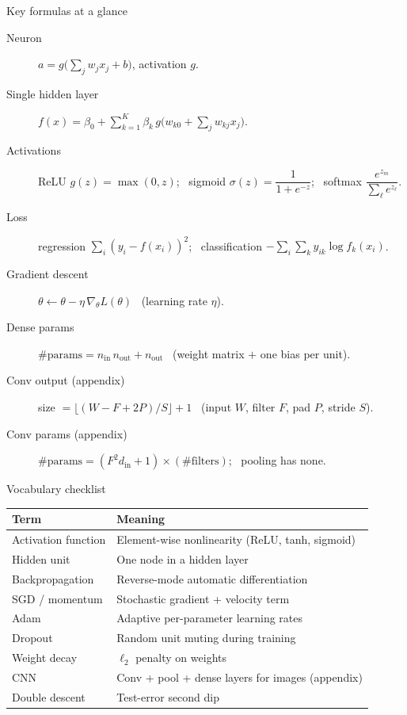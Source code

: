 \documentclass[aspectratio=169,11pt]{beamer}
\begin{document}
\begin{frame}{Key formulas at a glance}
  \footnotesize
  \begin{description}
    \item[Neuron] $a=g\!\big(\textstyle\sum_j w_j x_j+b\big)$, activation $g$.
    \item[Single hidden layer] $f(x)=\beta_0+\sum_{k=1}^{K}\beta_k\,g\!\big(w_{k0}+\sum_j w_{kj}x_j\big)$.
    \item[Activations] ReLU $g(z)=\max(0,z)$; \ sigmoid $\sigma(z)=\dfrac{1}{1+e^{-z}}$; \ softmax $\dfrac{e^{z_m}}{\sum_\ell e^{z_\ell}}$.
    \item[Loss] regression $\sum_i(y_i-f(x_i))^2$; \ classification $-\sum_i\sum_k y_{ik}\log f_k(x_i)$.
    \item[Gradient descent] $\theta \leftarrow \theta-\eta\,\nabla_\theta L(\theta)$ \ (learning rate $\eta$).
    \item[Dense params] $\#\text{params}=n_{\text{in}}\,n_{\text{out}}+n_{\text{out}}$ \ (weight matrix $+$ one bias per unit).
    \item[Conv output (appendix)] size $=\big\lfloor (W-F+2P)/S\big\rfloor+1$ \ (input $W$, filter $F$, pad $P$, stride $S$).
    \item[Conv params (appendix)] $\#\text{params}=(F^2 d_{\text{in}}+1)\times(\text{\#filters})$; \ pooling has none.
  \end{description}
\end{frame}

\begin{frame}{Vocabulary checklist}
  \footnotesize
  \begin{tabular}{ll}
    \toprule
    \textbf{Term} & \textbf{Meaning} \\
    \midrule
    Activation function & Element-wise nonlinearity (ReLU, tanh, sigmoid) \\
    Hidden unit & One node in a hidden layer \\
    Backpropagation & Reverse-mode automatic differentiation \\
    SGD / momentum & Stochastic gradient + velocity term \\
    Adam & Adaptive per-parameter learning rates \\
    Dropout & Random unit muting during training \\
    Weight decay & $\ell_2$ penalty on weights \\
    CNN & Conv + pool + dense layers for images (appendix) \\
    Double descent & Test-error second dip \\
    \bottomrule
  \end{tabular}
\end{frame}
\end{document}

